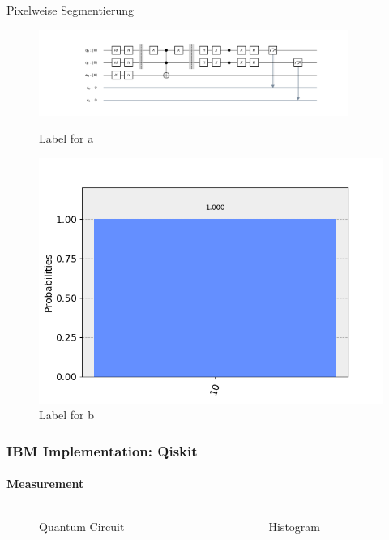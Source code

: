 \begin{frame}{Pixelweise Segmentierung}
	\begin{figure}[ht]
		\begin{minipage}[b]{0.75\linewidth}
			\centering
			\includegraphics[trim=190 80 190 0,width=0.9\textwidth]{code/data/images/qiskit-circuit.png}
			\caption{Label for a}
			\label{fig:a}
		\end{minipage}
		\hspace{0.5cm}
		\begin{minipage}[b]{0.2\linewidth}
			\centering
			\includegraphics[width=\textwidth]{code/data/images/qiskit-histogram.png}
			\caption{Label for b}
			\label{fig:b}
		\end{minipage}
	\end{figure}
\end{frame}

\begin{frame}[fragile]{}
	\frametitle{IBM Implementation: Qiskit}
	\framesubtitle{Measurement}
	\begin{columns}
		\begin{column}{0.75\textwidth}
			\begin{figure}
				\caption{Quantum Circuit}
			\end{figure}
		\end{column}
		\begin{column}{0.25\textwidth}  
			\begin{figure}
				\caption{Histogram}
			\end{figure}
		\end{column}
	\end{columns}
\end{frame}	

